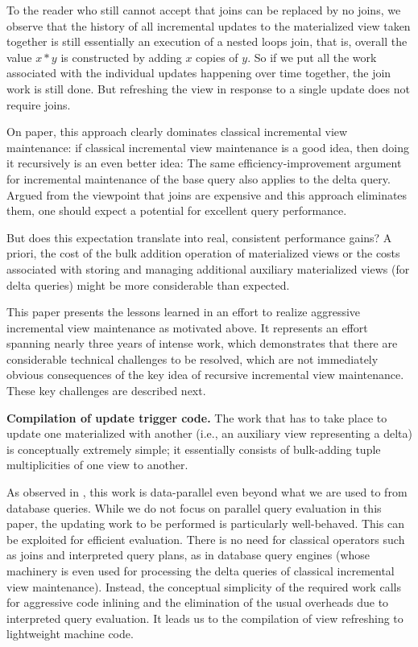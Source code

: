 To the reader who still cannot accept that joins can be replaced by no joins, we observe that the history of all incremental updates to the materialized view taken together is still essentially an execution of a nested loops join, that is, overall the value $x*y$ is constructed by adding $x$ copies of $y$. So if we put all the work associated with the individual updates happening over time together, the join work is still done. But refreshing the view in response to a single update does not require joins.


On paper, this approach clearly dominates classical incremental view maintenance: if classical incremental view maintenance is a good idea, then doing it recursively is an even better idea: The same efficiency-improvement argument for incremental maintenance of the base query also applies to the delta query. Argued from the viewpoint that joins are expensive and this approach eliminates them, one should expect a potential for excellent query performance.

But does this expectation translate into real, consistent performance gains? A priori, the cost of the bulk addition operation of materialized views or the costs associated with storing and managing additional auxiliary materialized views (for delta queries) might be more considerable than expected.


\medskip


This paper presents the lessons learned in an effort to realize aggressive incremental view maintenance as motivated above. It represents an effort spanning nearly three years of intense work, which demonstrates that there are considerable technical challenges to be resolved, which are not immediately obvious consequences of the key idea of recursive incremental view maintenance. These key challenges are described next.

{\bf Compilation of update trigger code.}
%
The work that has to take place to update one materialized with another (i.e., an auxiliary view representing a delta) is conceptually extremely simple; it essentially consists of bulk-adding tuple multiplicities of one view to another.

As observed in \cite{koch-pods:10}, this work is data-parallel even beyond what we are used to from database queries. While we do not focus on parallel query evaluation in this paper, the updating work to be performed is particularly well-behaved. This can be exploited for efficient evaluation. 
There is no need for classical operators such as joins and interpreted query plans, as in database query engines (whose machinery is even used for processing the delta queries of classical incremental view maintenance). Instead, the conceptual simplicity of the required work calls for aggressive code inlining and the elimination of the usual overheads due to interpreted query evaluation. It leads us to the compilation of view refreshing to lightweight machine code.

